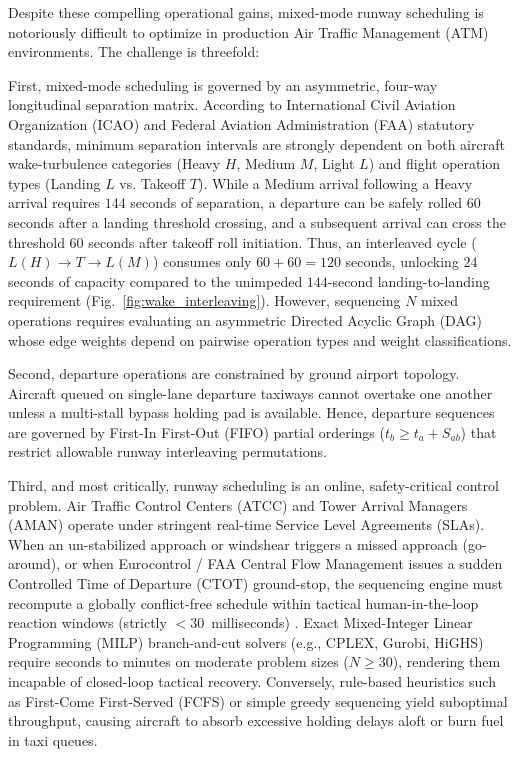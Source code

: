 \documentclass[10pt,journal,compsoc]{IEEEtran}
\begin{document}
Despite these compelling operational gains, mixed-mode runway scheduling is notoriously difficult to optimize in production Air Traffic Management (ATM) environments. The challenge is threefold:

First, mixed-mode scheduling is governed by an asymmetric, four-way longitudinal separation matrix. According to International Civil Aviation Organization (ICAO) and Federal Aviation Administration (FAA) statutory standards, minimum separation intervals are strongly dependent on both aircraft wake-turbulence categories (Heavy $H$, Medium $M$, Light $L$) and flight operation types (Landing $L$ vs. Takeoff $T$). While a Medium arrival following a Heavy arrival requires $144$ seconds of separation, a departure can be safely rolled $60$ seconds after a landing threshold crossing, and a subsequent arrival can cross the threshold $60$ seconds after takeoff roll initiation. Thus, an interleaved cycle ($L(H) \to T \to L(M)$) consumes only $60 + 60 = 120$ seconds, unlocking $24$ seconds of capacity compared to the unimpeded $144$-second landing-to-landing requirement (Fig.~\ref{fig:wake_interleaving}). However, sequencing $N$ mixed operations requires evaluating an asymmetric Directed Acyclic Graph (DAG) whose edge weights depend on pairwise operation types and weight classifications.

Second, departure operations are constrained by ground airport topology. Aircraft queued on single-lane departure taxiways cannot overtake one another unless a multi-stall bypass holding pad is available. Hence, departure sequences are governed by First-In First-Out (FIFO) partial orderings ($t_b \ge t_a + S_{ab}$) that restrict allowable runway interleaving permutations.

Third, and most critically, runway scheduling is an online, safety-critical control problem. Air Traffic Control Centers (ATCC) and Tower Arrival Managers (AMAN) operate under stringent real-time Service Level Agreements (SLAs). When an un-stabilized approach or windshear triggers a missed approach (go-around), or when Eurocontrol / FAA Central Flow Management issues a sudden Controlled Time of Departure (CTOT) ground-stop, the sequencing engine must recompute a globally conflict-free schedule within tactical human-in-the-loop reaction windows (strictly $< 30$~milliseconds) \cite{ikli2021,solveling2014}. Exact Mixed-Integer Linear Programming (MILP) branch-and-cut solvers (e.g., CPLEX, Gurobi, HiGHS) require seconds to minutes on moderate problem sizes ($N \ge 30$), rendering them incapable of closed-loop tactical recovery. Conversely, rule-based heuristics such as First-Come First-Served (FCFS) or simple greedy sequencing yield suboptimal throughput, causing aircraft to absorb excessive holding delays aloft or burn fuel in taxi queues.
\end{document}
